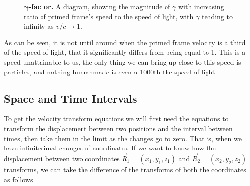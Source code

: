 \begin{figure}[H]
	\centering
	\caption{$\boldsymbol{\gamma}$\textbf{-factor.} A diagram, showing the magnitude of $\gamma$ with increasing ratio of primed frame's speed to the speed of light, with ${\gamma}$ tending to infinity as ${v}/{c}\rightarrow 1$.}
	\label{fig: Gamma Factor}
\end{figure}

As can be seen, it is not until around when the primed frame velocity is a third of the speed of light, that it significantly differs from being equal to 1.
This is a speed unattainable to us, the only thing we can bring up close to this speed is particles, and nothing humanmade is even a 1000th the speed of light.

\subsection{Space and Time Intervals} \label{subsect: Space and Time Intervals}

To get the velocity transform equations we will first need the equations to transform the displacement between two positions and the interval between times, then take them in the limit as the changes go to zero.
That is, when we have infinitesimal changes of coordinates.
If we want to know how the displacement between two coordinates ${\vec{R}_1} = (x_1,y_1,z_1)$ and ${\vec{R}_2} = (x_2,y_2,z_2)$ transforms, we can take the difference of the transforms of both the coordinates as follows

